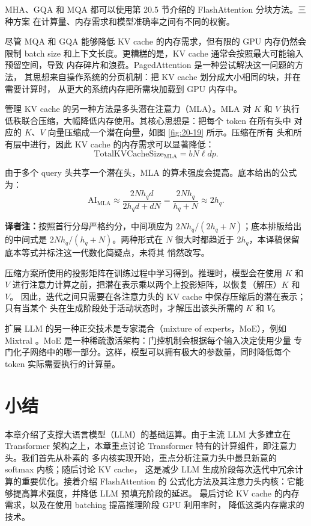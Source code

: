 MHA、GQA 和 MQA 都可以使用第 20.5 节介绍的 FlashAttention 分块方法。三种方案
在计算量、内存需求和模型准确率之间有不同的权衡。

尽管 MQA 和 GQA 能够降低 KV cache 的内存需求，但有限的 GPU 内存仍然会限制 batch
size 和上下文长度。更糟糕的是，KV cache 通常会按照最大可能输入预留空间，导致
内存碎片和浪费。PagedAttention \cite{ch20-12} 是一种尝试解决这一问题的方法，
其思想来自操作系统的分页机制：把 KV cache 划分成大小相同的块，并在需要计算时，
从更大的系统内存把所需块加载到 GPU 内存中。

管理 KV cache 的另一种方法是多头潜在注意力（MLA）\cite{ch20-16}。MLA 对 $K$ 和
$V$ 执行低秩联合压缩，大幅降低内存使用。其核心思想是：把每个 token 在所有头中
对应的 $K$、$V$ 向量压缩成一个潜在向量，如图 \ref{fig:20-19} 所示。压缩在所有
头和所有层中进行，因此 KV cache 的内存需求可以显著降低：
\begin{equation}
  \mathrm{TotalKVCacheSize}_{\mathrm{MLA}}
  =bN\ell d p .
\label{eq:ch20-kv-mla}
\end{equation}

由于多个 query 头共享一个潜在头，MLA 的算术强度会提高。底本给出的公式为：
\begin{equation}
  \mathrm{AI}_{\mathrm{MLA}}
  \approx
  \frac{2Nh_qd}{2h_qd+dN}
  =\frac{2Nh_q}{h_q+N}
  \approx 2h_q .
\label{eq:ch20-ai-mla}
\end{equation}

\noindent\textbf{译者注：}按照首行分母严格约分，中间项应为
$2Nh_q/(2h_q+N)$；底本排版给出的中间式是 $2Nh_q/(h_q+N)$。两种形式在
$N$ 很大时都趋近于 $2h_q$，本译稿保留底本等式并标注这一代数化简疑点，未将其
悄然改写。

压缩方案所使用的投影矩阵在训练过程中学习得到。推理时，模型会在使用 $K$ 和 $V$
进行注意力计算之前，把潜在表示乘以两个上投影矩阵，以恢复（解压）$K$ 和 $V$。
因此，迭代之间只需要在各注意力头的 KV cache 中保存压缩后的潜在表示；只有当某个
头在生成阶段处于活动状态时，才解压出该头所需的 $K$ 和 $V$。

扩展 LLM 的另一种正交技术是专家混合（mixture of experts，MoE），例如 Mixtral
\cite{ch20-17}。MoE 是一种稀疏激活架构：门控机制会根据每个输入决定使用少量
专门化子网络中的哪一部分。这样，模型可以拥有极大的参数量，同时降低每个 token
实际需要执行的计算量。

\section{小结}
\label{sec:ch20-summary}

本章介绍了支撑大语言模型（LLM）的基础运算。由于主流 LLM 大多建立在 Transformer
架构之上，本章重点讨论 Transformer 特有的计算组件，即注意力头。我们首先从朴素的
多内核实现开始，重点分析注意力头中最具新意的 softmax 内核；随后讨论 KV cache，
这是减少 LLM 生成阶段每次迭代中冗余计算的重要优化。接着介绍 FlashAttention 的
公式化方法及其注意力头内核：它能够提高算术强度，并降低 LLM 预填充阶段的延迟。
最后讨论 KV cache 的内存需求，以及在使用 batching 提高推理阶段 GPU 利用率时，
降低这类内存需求的技术。

